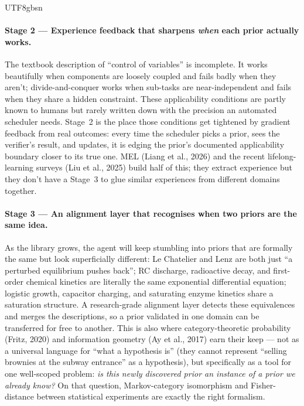 \documentclass{article}
\begin{document}
\begin{CJK*}{UTF8}{gbsn}
\paragraph{Stage 2 --- Experience feedback that sharpens
\emph{when} each prior actually works.} The textbook description
of ``control of variables'' is incomplete. It works beautifully
when components are loosely coupled and fails badly when they
aren't; divide-and-conquer works when sub-tasks are
near-independent and fails when they share a hidden constraint.
These applicability conditions are partly known to humans but
rarely written down with the precision an automated scheduler
needs. Stage~2 is the place those conditions get tightened by
gradient feedback from real outcomes: every time the scheduler
picks a prior, sees the verifier's result, and updates, it is
edging the prior's documented applicability boundary closer to
its true one. MEL (Liang et al., 2026) and the recent
lifelong-learning surveys (Liu et al., 2025) build half of this;
they extract experience but they don't have a Stage~3 to glue
similar experiences from different domains together.

\paragraph{Stage 3 --- An alignment layer that recognises when
two priors are the same idea.} As the library grows, the agent
will keep stumbling into priors that are formally the same but
look superficially different: Le Chatelier and Lenz are both
just ``a perturbed equilibrium pushes back''; RC discharge,
radioactive decay, and first-order chemical kinetics are
literally the same exponential differential equation; logistic
growth, capacitor charging, and saturating enzyme kinetics share
a saturation structure. A research-grade alignment layer detects
these equivalences and merges the descriptions, so a prior
validated in one domain can be transferred for free to another.
This is also where category-theoretic probability
(Fritz, 2020) and information geometry (Ay et al., 2017) earn
their keep --- not as a universal language for ``what a
hypothesis is'' (they cannot represent ``selling brownies at the
subway entrance'' as a hypothesis), but specifically as a tool
for one well-scoped problem: \emph{is this newly discovered
prior an instance of a prior we already know?} On that
question, Markov-category isomorphism and Fisher-distance
between statistical experiments are exactly the right
formalism.


\end{CJK*}
\end{document}
